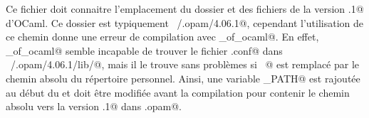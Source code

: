 \documentclass[a4paper,12pt]{article}
\begin{document}
Ce fichier \verb@Makefile@ doit connaitre l'emplacement du dossier \verb@opam@ et des fichiers de la version .1@ d'OCaml. Ce dossier est typiquement \verb@~/.opam/4.06.1@, cependant l'utilisation de ce chemin donne une erreur de compilation avec \verb@js_of_ocaml@. En effet, \verb@js_of_ocaml@ semble incapable de trouver le fichier \verb@findlib.conf@ dans \verb@~/.opam/4.06.1/lib/@, mais il le trouve sans problèmes si \verb@~@ est remplacé par le chemin absolu du répertoire personnel. Ainsi, une variable \verb@OPAM_PATH@ est rajoutée au début du \verb@Makefile@ et doit être modifiée avant la compilation pour contenir le chemin absolu vers la version .1@ dans \verb@.opam@.
\end{document}
